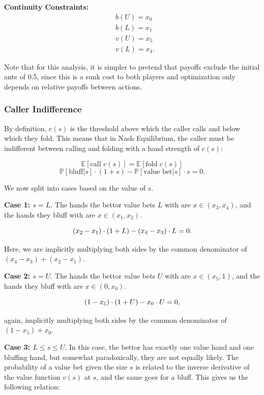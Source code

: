 \documentclass[../../main/main.tex]{subfiles}
\begin{document}
\textbf{Continuity Constraints:}
\begin{align}
    & b(U) = x_0 \\
    & b(L) = x_1 \\
    & v(U) = x_5 \\
    & v(L) = x_4.
\end{align}

 Note that for this analysis, it is simpler to pretend that payoffs exclude the initial ante of 0.5, since this is a sunk cost to both players and optimization only depends on relative payoffs between actions.

\subsubsection{Caller Indifference}
\label{subsec:caller_indifference}

By definition, $c(s)$ is the threshold above which the caller calls and below which they fold. This means that in Nash Equilibrium, the caller must be indifferent between calling and folding with a hand strength of $c(s)$:


  \[  \mathbb{E}[\text{call } c(s)] = \mathbb{E}[\text{fold } c(s)] \]
  \[  \mathbb{P}[\text{bluff} | s] \cdot (1+s) - \mathbb{P}[\text{value bet} | s]\cdot s = 0. \]

We now split into cases based on the value of $s$.

\textbf{Case 1: $s = L$}. The hands the bettor value bets $L$ with are $x \in (x_3, x_4)$, and the hands they bluff with are $x \in (x_1, x_2)$. 

\begin{equation}{\label{callindiffmin}}
    (x_2-x_1) \cdot (1+L) - (x_4-x_3) \cdot L = 0.
\end{equation}

Here, we are implicitly multiplying both sides by the common denominator of $(x_4-x_3) + (x_2-x_1)$.

\textbf{Case 2: $s = U$}. The hands the bettor value bets $U$ with are $x \in (x_5, 1)$, and the hands they bluff with are $x \in (0, x_0)$. 

\begin{equation}{\label{callindiffmax}}
    (1-x_5) \cdot (1+U) - x_0 \cdot U = 0,
\end{equation}

again, implicitly multiplying both sides by the common denominator of $(1-x_5) + x_0$.

\textbf{Case 3: $L \leq s \leq U$}. In this case, the bettor has exactly one value hand and one bluffing hand, but somewhat paradoxically, they are not equally likely. The probability of a value bet given the size $s$ is related to the inverse derivative of the value function $v(s)$ at $s$, and the same goes for a bluff. This gives us the following relation:
\end{document}
